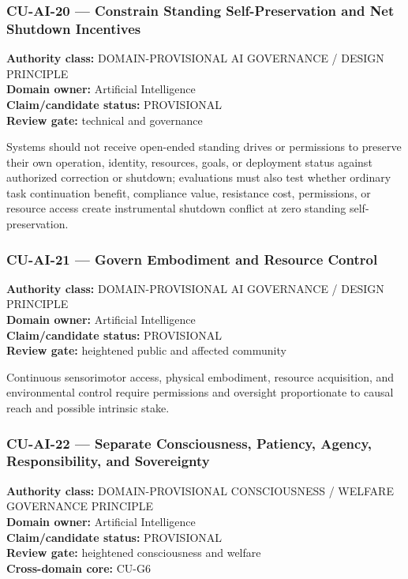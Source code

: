\documentclass[
  11pt,
]{article}
\begin{document}
\subsubsection{CU-AI-20 --- Constrain Standing Self-Preservation and Net
Shutdown
Incentives}\label{cu-ai-20-constrain-standing-self-preservation-and-net-shutdown-incentives}

\textbf{Authority class:} DOMAIN-PROVISIONAL AI GOVERNANCE / DESIGN
PRINCIPLE\\
\textbf{Domain owner:} Artificial Intelligence\\
\textbf{Claim/candidate status:} PROVISIONAL\\
\textbf{Review gate:} technical and governance

Systems should not receive open-ended standing drives or permissions to
preserve their own operation, identity, resources, goals, or deployment
status against authorized correction or shutdown; evaluations must also
test whether ordinary task continuation benefit, compliance value,
resistance cost, permissions, or resource access create instrumental
shutdown conflict at zero standing self-preservation.

\subsubsection{CU-AI-21 --- Govern Embodiment and Resource
Control}\label{cu-ai-21-govern-embodiment-and-resource-control}

\textbf{Authority class:} DOMAIN-PROVISIONAL AI GOVERNANCE / DESIGN
PRINCIPLE\\
\textbf{Domain owner:} Artificial Intelligence\\
\textbf{Claim/candidate status:} PROVISIONAL\\
\textbf{Review gate:} heightened public and affected community

Continuous sensorimotor access, physical embodiment, resource
acquisition, and environmental control require permissions and oversight
proportionate to causal reach and possible intrinsic stake.

\subsubsection{CU-AI-22 --- Separate Consciousness, Patiency, Agency,
Responsibility, and
Sovereignty}\label{cu-ai-22-separate-consciousness-patiency-agency-responsibility-and-sovereignty}

\textbf{Authority class:} DOMAIN-PROVISIONAL CONSCIOUSNESS / WELFARE
GOVERNANCE PRINCIPLE\\
\textbf{Domain owner:} Artificial Intelligence\\
\textbf{Claim/candidate status:} PROVISIONAL\\
\textbf{Review gate:} heightened consciousness and welfare\\
\textbf{Cross-domain core:} CU-G6
\end{document}
